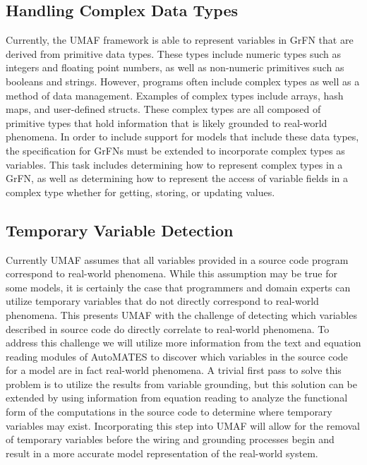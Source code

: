 \subsection{Handling Complex Data Types \label{sec:complex_types}}
Currently, the UMAF framework is able to represent variables in GrFN that are derived from primitive data types.
These types include numeric types such as integers and floating point numbers, as well as non-numeric primitives such as booleans and strings.
However, programs often include complex types as well as a method of data management.
Examples of complex types include arrays, hash maps, and user-defined structs.
These complex types are all composed of primitive types that hold information that is likely grounded to real-world phenomena.
In order to include support for models that include these data types, the specification for GrFNs must be extended to incorporate complex types as variables.
This task includes determining how to represent complex types in a GrFN, as well as determining how to represent the access of variable fields in a complex type whether for getting, storing, or updating values.

\subsection{Temporary Variable Detection\label{sec:temp_vars}}
Currently UMAF assumes that all variables provided in a source code program correspond to real-world phenomena.
While this assumption may be true for some models, it is certainly the case that programmers and domain experts can utilize temporary variables that do not directly correspond to real-world phenomena.
This presents UMAF with the challenge of detecting which variables described in source code do directly correlate to real-world phenomena.
To address this challenge we will utilize more information from the text and equation reading modules of AutoMATES to discover which variables in the source code for a model are in fact real-world phenomena.
A trivial first pass to solve this problem is to utilize the results from variable grounding, but this solution can be extended by using information from equation reading to analyze the functional form of the computations in the source code to determine where temporary variables may exist.
Incorporating this step into UMAF will allow for the removal of temporary variables before the wiring and grounding processes begin and result in a more accurate model representation of the real-world system.

